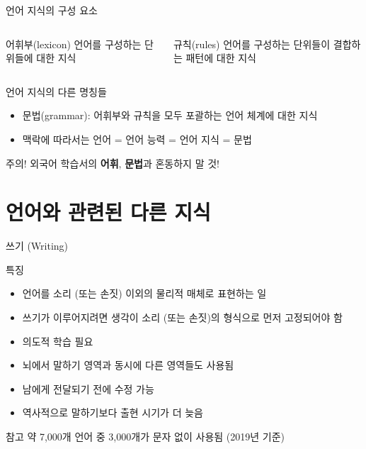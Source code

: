 \documentclass[11pt, aspectratio=169]{beamer}
\begin{document}
\begin{frame}[t]{언어 지식의 구성 요소}
  \begin{columns}
    \begin{column}[T]{0.5\textwidth}
      \begin{block}{어휘부(lexicon)}
        언어를 구성하는 단위들에 대한 지식
      \end{block}
    \end{column}
    \begin{column}[T]{0.5\textwidth}
      \begin{block}{규칙(rules)}
        언어를 구성하는 단위들이 결합하는 패턴에 대한 지식
      \end{block}
    \end{column}
  \end{columns}
  \begin{block}{언어 지식의 다른 명칭들}
    \begin{itemize}
      \item 문법(grammar): 어휘부와 규칙을 모두 포괄하는 언어 체계에 대한 지식
      \item 맥락에 따라서는 언어 = 언어 능력 = 언어 지식 = 문법
    \end{itemize}
  \end{block}
  \begin{block}{주의!}
    외국어 학습서의 \textbf{어휘}, \textbf{문법}과 혼동하지 말 것!
  \end{block}

\end{frame}

\section{언어와 관련된 다른 지식}

\begin{frame}[t]{쓰기 (Writing)}
  \begin{block}{특징}
    \begin{itemize}
      \item 언어를 소리 (또는 손짓) 이외의 물리적 매체로 표현하는 일
      \item 쓰기가 이루어지려면 생각이 소리 (또는 손짓)의 형식으로 먼저 고정되어야 함
      \item 의도적 학습 필요
      \item 뇌에서 말하기 영역과 동시에 다른 영역들도 사용됨
      \item 남에게 전달되기 전에 수정 가능
      \item 역사적으로 말하기보다 출현 시기가 더 늦음
    \end{itemize}
  \end{block}
  \begin{block}{참고}
    약 7,000개 언어 중 3,000개가 문자 없이 사용됨 (2019년 기준)
  \end{block}
\end{frame}
\end{document}

